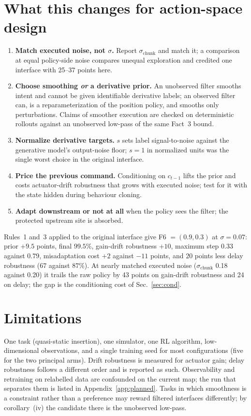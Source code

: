 \documentclass{article}
\newcommand{\schunk}{\sigma_{\mathrm{chunk}}}
\begin{document}
\section{What this changes for action-space design}
\label{sec:rules}

\begin{enumerate}
\item \textbf{Match executed noise, not $\sigma$.} Report $\schunk$ and match it; a comparison at equal policy-side noise compares unequal exploration and credited one interface with 25--37 points here.
\item \textbf{Choose smoothing \emph{or} a derivative prior.} An unobserved filter smooths intent and cannot be given identifiable derivative labels; an observed filter can, is a reparameterization of the position policy, and smooths only perturbations. Claims of smoother execution are checked on deterministic rollouts against an unobserved low-pass of the same Fact~3 bound.
\item \textbf{Normalize derivative targets.} $s$ sets label signal-to-noise against the generative model's output-noise floor; $s=1$ in normalized units was the single worst choice in the original interface.
\item \textbf{Price the previous command.} Conditioning on $c_{t-1}$ lifts the prior and costs actuator-drift robustness that grows with executed noise; test for it with the state hidden during behaviour cloning.
\item \textbf{Adapt downstream or not at all} when the policy sees the filter; the protected upstream site is absorbed.
\end{enumerate}
Rules~1 and~3 applied to the original interface give F6 $=(0.9,0.3)$ at $\sigma=0.07$: prior $+9.5$ points, final $99.5\%$, gain-drift robustness $+10$, maximum step $0.33$ against $0.79$, misadaptation cost $+2$ against $-11$ points, and $20$ points less delay robustness ($67$ against $87\%$). At nearly matched executed noise ($\schunk$ 0.18 against 0.20) it trails the raw policy by 43 points on gain-drift robustness and 24 on delay; the gap is the conditioning cost of Sec.~\ref{sec:cond}.

\section{Limitations}

One task (quasi-static insertion), one simulator, one RL algorithm, low-dimensional observations, and a single training seed for most configurations (five for the two principal arms). Drift robustness is measured for actuator gain; delay robustness follows a different order and is reported as such. Observability and retraining on relabelled data are confounded on the current map; the run that separates them is listed in Appendix~\ref{app:planned}. Tasks in which smoothness is a constraint rather than a preference may reward filtered interfaces differently; by corollary~(iv) the candidate there is the unobserved low-pass.
\end{document}

